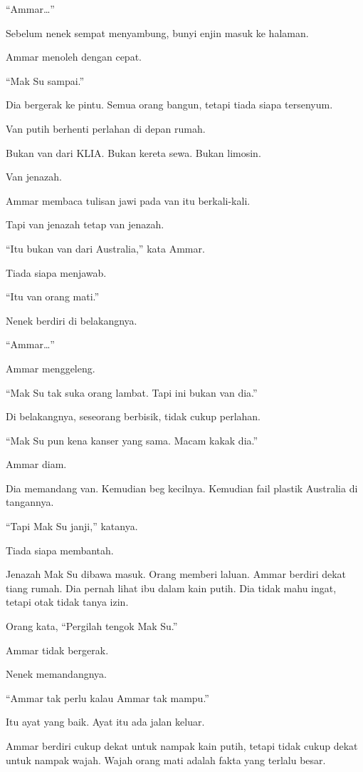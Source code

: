 \documentclass[
  11pt,
  a5paper,
  openany,
  oneside]{book}
\begin{document}
``Ammar\ldots''

Sebelum nenek sempat menyambung, bunyi enjin masuk ke halaman.

Ammar menoleh dengan cepat.

``Mak Su sampai.''

Dia bergerak ke pintu. Semua orang bangun, tetapi tiada siapa tersenyum.

Van putih berhenti perlahan di depan rumah.

Bukan van dari KLIA. Bukan kereta sewa. Bukan limosin.

Van jenazah.

Ammar membaca tulisan jawi pada van itu berkali-kali.

Tapi van jenazah tetap van jenazah.

``Itu bukan van dari Australia,'' kata Ammar.

Tiada siapa menjawab.

``Itu van orang mati.''

Nenek berdiri di belakangnya.

``Ammar\ldots''

Ammar menggeleng.

``Mak Su tak suka orang lambat. Tapi ini bukan van dia.''

Di belakangnya, seseorang berbisik, tidak cukup perlahan.

``Mak Su pun kena kanser yang sama. Macam kakak dia.''

Ammar diam.

Dia memandang van. Kemudian beg kecilnya. Kemudian fail plastik
Australia di tangannya.

``Tapi Mak Su janji,'' katanya.

Tiada siapa membantah.

Jenazah Mak Su dibawa masuk. Orang memberi laluan. Ammar berdiri dekat
tiang rumah. Dia pernah lihat ibu dalam kain putih. Dia tidak mahu
ingat, tetapi otak tidak tanya izin.

Orang kata, ``Pergilah tengok Mak Su.''

Ammar tidak bergerak.

Nenek memandangnya.

``Ammar tak perlu kalau Ammar tak mampu.''

Itu ayat yang baik. Ayat itu ada jalan keluar.

Ammar berdiri cukup dekat untuk nampak kain putih, tetapi tidak cukup
dekat untuk nampak wajah. Wajah orang mati adalah fakta yang terlalu
besar.
\end{document}
